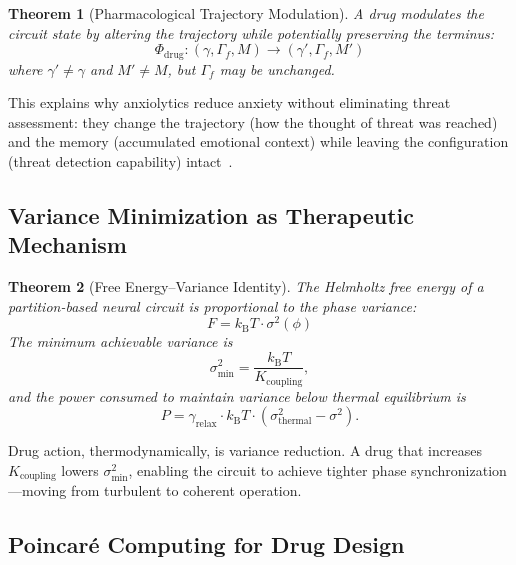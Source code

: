 \documentclass[twocolumn,10pt]{article}
\newtheorem{theorem}{Theorem}[section]
\theoremstyle{remark}
\newcommand{\kB}{k_{\mathrm{B}}}
\newcommand{\Gstate}{\Gamma}
\begin{document}
\begin{theorem}[Pharmacological Trajectory Modulation]
\label{thm:drug_traj}
A drug modulates the circuit state by altering the trajectory while potentially preserving the terminus:
\begin{equation}
  \boxed{\Phi_{\mathrm{drug}}: (\gamma, \Gstate_f, M) \to (\gamma', \Gstate_f, M')}
\end{equation}
where $\gamma' \neq \gamma$ and $M' \neq M$, but $\Gstate_f$ may be unchanged.
\end{theorem}

This explains why anxiolytics reduce anxiety without eliminating threat assessment: they change the trajectory (how the thought of threat was reached) and the memory (accumulated emotional context) while leaving the configuration (threat detection capability) intact~\citep{stahl2021essential}.

\subsection{Variance Minimization as Therapeutic Mechanism}

\begin{theorem}[Free Energy--Variance Identity]
\label{thm:variance}
The Helmholtz free energy of a partition-based neural circuit is proportional to the phase variance:
\begin{equation}
  \boxed{F = \kB T \cdot \sigma^2(\phi)}
\end{equation}
The minimum achievable variance is
\begin{equation}
  \sigma^2_{\min} = \frac{\kB T}{K_{\mathrm{coupling}}},
\end{equation}
and the power consumed to maintain variance below thermal equilibrium is
\begin{equation}
  P = \gamma_{\mathrm{relax}} \cdot \kB T \cdot (\sigma^2_{\mathrm{thermal}} - \sigma^2).
\end{equation}
\end{theorem}

Drug action, thermodynamically, is variance reduction. A drug that increases $K_{\mathrm{coupling}}$ lowers $\sigma^2_{\min}$, enabling the circuit to achieve tighter phase synchronization---moving from turbulent to coherent operation.

\subsection{Poincar\'e Computing for Drug Design}
\end{document}
